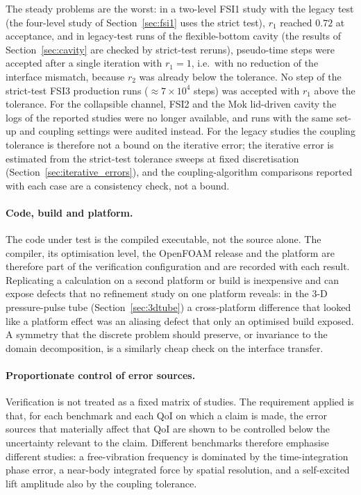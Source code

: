 The steady problems are the worst: in a two-level FSI1 study with the legacy test (the four-level study of Section~\ref{sec:fsi1} uses the strict test), $r_1$ reached $0.72$ at acceptance, and in legacy-test runs of the flexible-bottom cavity (the results of Section~\ref{sec:cavity} are checked by strict-test reruns), pseudo-time steps were accepted after a single iteration with $r_1=1$, i.e.\ with no reduction of the interface mismatch, because $r_2$ was already below the tolerance.
No step of the strict-test FSI3 production runs ($\approx7\times10^{4}$ steps) was accepted with $r_1$ above the tolerance.
For the collapsible channel, FSI2 and the Mok lid-driven cavity the logs of the reported studies were no longer available, and runs with the same set-up and coupling settings were audited instead.
For the legacy studies the coupling tolerance is therefore not a bound on the iterative error; the iterative error is estimated from the strict-test tolerance sweeps at fixed discretisation (Section~\ref{sec:iterative_errors}), and the coupling-algorithm comparisons reported with each case are a consistency check, not a bound.

\paragraph{Code, build and platform.}
The code under test is the compiled executable, not the source alone.
The compiler, its optimisation level, the OpenFOAM release and the platform are therefore part of the verification configuration and are recorded with each result.
Replicating a calculation on a second platform or build is inexpensive and can expose defects that no refinement study on one platform reveals: in the 3-D pressure-pulse tube (Section~\ref{sec:3dtube}) a cross-platform difference that looked like a platform effect was an aliasing defect that only an optimised build exposed.
A symmetry that the discrete problem should preserve, or invariance to the domain decomposition, is a similarly cheap check on the interface transfer.

\paragraph{Proportionate control of error sources.}
Verification is not treated as a fixed matrix of studies.
The requirement applied is that, for each benchmark and each QoI on which a claim is made, the error sources that materially affect that QoI are shown to be controlled below the uncertainty relevant to the claim.
Different benchmarks therefore emphasise different studies: a free-vibration frequency is dominated by the time-integration phase error, a near-body integrated force by spatial resolution, and a self-excited lift amplitude also by the coupling tolerance.

